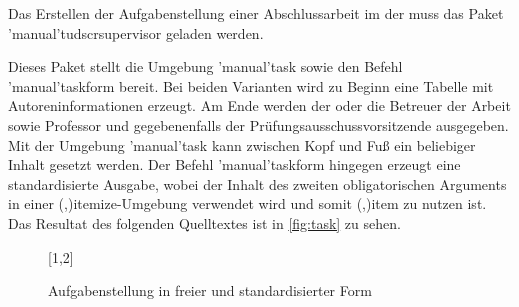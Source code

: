 \documentclass[%
  english,ngerman,%
  cdgeometry=no,DIV=12,%
  cd=false,cdfont=false,cdtitle=true,%
  headings=normal,%
  automark,%
  listof=toc,%
]{tudscrartcl}
\begin{document}
Das Erstellen der Aufgabenstellung einer Abschlussarbeit im \CD der \TnUD muss 
das Paket \Package'manual'{tudscrsupervisor} geladen werden.
%
\begin{Preamble}
\usepackage{tudscrsupervisor}

\end{Preamble}
%
Dieses Paket stellt die Umgebung \Environment'manual'{task} sowie den Befehl 
\Macro'manual'{taskform} bereit. Bei beiden Varianten wird zu Beginn eine 
Tabelle mit Autoreninformationen erzeugt. Am Ende werden der oder die Betreuer 
der Arbeit sowie Professor und gegebenenfalls der Prüfungsausschussvorsitzende 
ausgegeben. Mit der Umgebung \Environment'manual'{task} kann zwischen Kopf und 
Fuß ein beliebiger Inhalt gesetzt werden. Der Befehl \Macro'manual'{taskform} 
hingegen erzeugt eine standardisierte Ausgabe, wobei der Inhalt des zweiten 
obligatorischen Arguments in einer 
\Environment(,){itemize}-Umgebung 
verwendet wird und somit \Macro(,){item}
zu nutzen ist. Das Resultat des folgenden Quelltextes ist in \autoref{fig:task} 
zu sehen. 
%
\begin{figure}
[1,2]
\caption{%
  Aufgabenstellung in freier und standardisierter Form%
  \label{fig:task}%
}
\end{figure}
\end{document}
